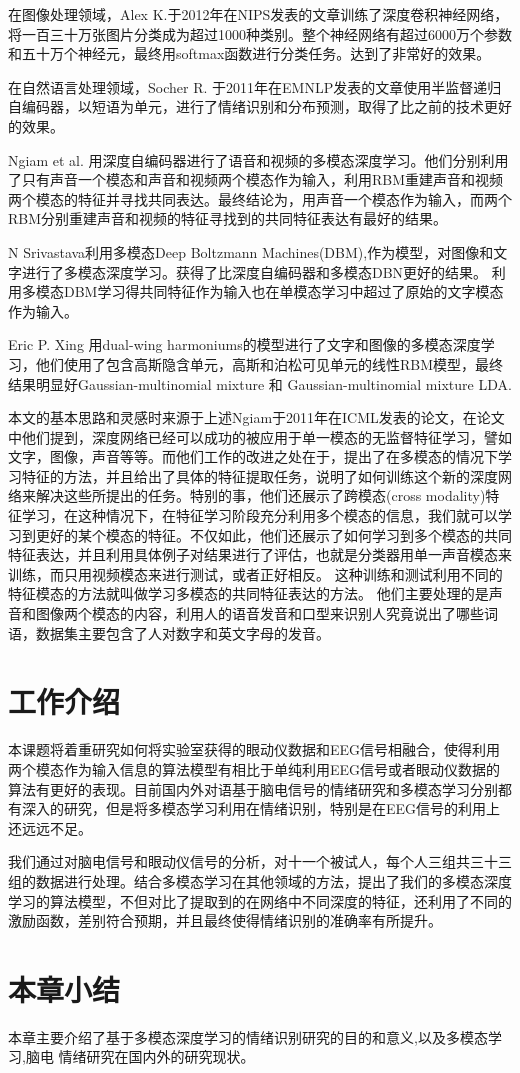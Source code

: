 	在图像处理领域，Alex K.于2012年在NIPS发表的文章训练了深度卷积神经网络，将一百三十万张图片分类成为超过1000种类别。整个神经网络有超过6000万个参数和五十万个神经元，最终用softmax函数进行分类任务。达到了非常好的效果。
	
	在自然语言处理领域，Socher R. 于2011年在EMNLP发表的文章使用半监督递归自编码器，以短语为单元，进行了情绪识别和分布预测，取得了比之前的技术更好的效果。
	
	Ngiam et al. 用深度自编码器进行了语音和视频的多模态深度学习。他们分别利用了只有声音一个模态和声音和视频两个模态作为输入，利用RBM重建声音和视频两个模态的特征并寻找共同表达。最终结论为，用声音一个模态作为输入，而两个RBM分别重建声音和视频的特征寻找到的共同特征表达有最好的结果。
	
	 N Srivastava利用多模态Deep Boltzmann Machines(DBM),作为模型，对图像和文字进行了多模态深度学习。获得了比深度自编码器和多模态DBN更好的结果。 利用多模态DBM学习得共同特征作为输入也在单模态学习中超过了原始的文字模态作为输入。
	 
	Eric P. Xing 用dual-wing harmoniums的模型进行了文字和图像的多模态深度学习，他们使用了包含高斯隐含单元，高斯和泊松可见单元的线性RBM模型，最终结果明显好Gaussian-multinomial mixture 和 Gaussian-multinomial mixture LDA.
	
		本文的基本思路和灵感时来源于上述Ngiam于2011年在ICML发表的论文，在论文中他们提到，深度网络已经可以成功的被应用于单一模态的无监督特征学习，譬如文字，图像，声音等等。而他们工作的改进之处在于，提出了在多模态的情况下学习特征的方法，并且给出了具体的特征提取任务，说明了如何训练这个新的深度网络来解决这些所提出的任务。特别的事，他们还展示了跨模态(cross modality)特征学习，在这种情况下，在特征学习阶段充分利用多个模态的信息，我们就可以学习到更好的某个模态的特征。不仅如此，他们还展示了如何学习到多个模态的共同特征表达，并且利用具体例子对结果进行了评估，也就是分类器用单一声音模态来训练，而只用视频模态来进行测试，或者正好相反。 这种训练和测试利用不同的特征模态的方法就叫做学习多模态的共同特征表达的方法。 他们主要处理的是声音和图像两个模态的内容，利用人的语音发音和口型来识别人究竟说出了哪些词语，数据集主要包含了人对数字和英文字母的发音。
	 
	 
\section{工作介绍}
	本课题将着重研究如何将实验室获得的眼动仪数据和EEG信号相融合，使得利用两个模态作为输入信息的算法模型有相比于单纯利用EEG信号或者眼动仪数据的算法有更好的表现。目前国内外对语基于脑电信号的情绪研究和多模态学习分别都有深入的研究，但是将多模态学习利用在情绪识别，特别是在EEG信号的利用上还远远不足。
		
	我们通过对脑电信号和眼动仪信号的分析，对十一个被试人，每个人三组共三十三组的数据进行处理。结合多模态学习在其他领域的方法，提出了我们的多模态深度学习的算法模型，不但对比了提取到的在网络中不同深度的特征，还利用了不同的激励函数，差别符合预期，并且最终使得情绪识别的准确率有所提升。
\section{本章小结}
	本章主要介绍了基于多模态深度学习的情绪识别研究的目的和意义,以及多模态学习,脑电 情绪研究在国内外的研究现状。